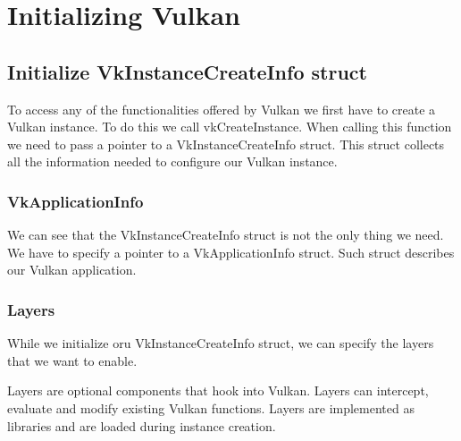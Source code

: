 \chapter{Initializing Vulkan}

\section{Initialize VkInstanceCreateInfo struct}

To access any of the functionalities offered by Vulkan we first have to create a Vulkan instance.
To do this we call vkCreateInstance.
When calling this function we need to pass a pointer to a VkInstanceCreateInfo struct.
This struct collects all the information needed to configure our Vulkan instance.

\begin{minipage}{\linewidth}{\noindent}

\end{minipage}

\subsection{VkApplicationInfo}

We can see that the VkInstanceCreateInfo struct is not the only thing we need.
We have to specify a pointer to a VkApplicationInfo struct. Such struct describes
our Vulkan application.

\begin{minipage}{\linewidth}{\noindent}
    
\end{minipage}

\subsection{Layers}

While we initialize oru VkInstanceCreateInfo struct, we can specify the layers
that we want to enable.

Layers are optional components that hook into Vulkan.
Layers can intercept, evaluate and modify existing Vulkan functions.
Layers are implemented as libraries and are loaded during instance creation.

